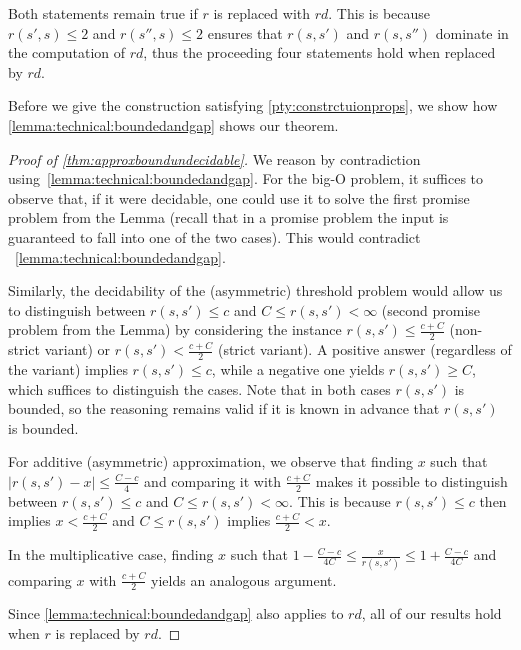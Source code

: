\documentclass{lmcs}
\theoremstyle{plain}
\theoremstyle{definition}
\theoremstyle{remark}
\newcommand\tvra{\mathit{r}}
\newcommand\tvrs{\mathit{rd}}
\begin{document}
\noindent Both statements remain true if $\tvra$ is replaced with $\tvrs$. This is because $\tvra(s',s)\le 2$ and $\tvra(s'',s)\le 2$ ensures that $\tvra(s,s')$ and $\tvra(s,s'')$ dominate in the computation of $\tvrs$, thus the proceeding four statements hold when replaced by $\tvrs$.

Before we give the construction satisfying \cref{pty:constrctuionprops}, we show how \cref{lemma:technical:boundedandgap} shows our theorem.
\begin{proof}[Proof of \cref{thm:approxboundundecidable}]
We reason by contradiction using~\cref{lemma:technical:boundedandgap}.
For the big-O problem,
it suffices to observe that, if it were decidable, one could use it to solve the first promise problem from the Lemma (recall that in a promise problem the input is guaranteed to fall into one of the two cases).
This would contradict ~\cref{lemma:technical:boundedandgap}.

Similarly, the decidability of the (asymmetric) threshold problem would allow us to distinguish between $\tvra(s,s') \le c$ and $C \le \tvra(s,s') < \infty$  (second promise problem from the Lemma) by considering the instance
$\tvra(s,s') \le \frac{c+C}{2}$ (non-strict variant) or $\tvra(s,s') < \frac{c+C}{2}$ (strict variant). A positive answer (regardless of the variant) implies $\tvra(s,s') \le c$, while a negative one yields $\tvra(s,s')\ge C$, which suffices
to distinguish the cases. Note that in both cases $\tvra(s,s')$ is bounded, so the reasoning remains valid  if it is known in advance that $\tvra(s,s')$ is bounded.

For additive  (asymmetric) approximation,  we observe that finding $x$ such that $|\tvra(s,s') - x| \le \frac{C-c}{4}$ and comparing it with $\frac{c+C}{2}$ makes it possible to distinguish between
$\tvra(s,s') \le c$ and $C \le \tvra(s,s') < \infty$. This is because $\tvra(s,s') \le c$ then implies $x < \frac{c+C}{2}$ and $C\le \tvra(s,s')$ implies $\frac{c+C}{2} < x$.

In the multiplicative case,  finding $x$ such that $1-\frac{C-c}{4C}\le \frac{x}{\tvra(s,s')}\le 1+\frac{C-c}{4C}$ and comparing $x$ with $ \frac{c+C}{2}$ yields an analogous argument.

 Since \cref{lemma:technical:boundedandgap} also applies to $\tvrs$, all of our results hold when $\tvra$ is replaced by  $\tvrs$.
\end{proof}
\end{document}
